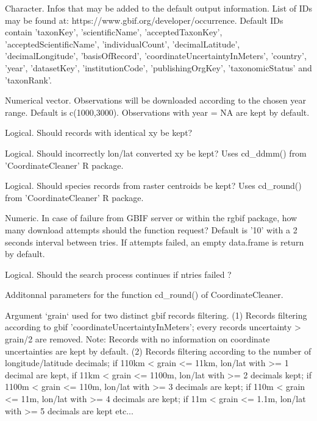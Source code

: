 \documentclass[a4paper]{book}
\begin{document}
\begin{Arguments}
\begin{ldescription}
\item[\code{add\_infos}] Character. Infos that may be added to the default output information.
List of IDs may be found at: https://www.gbif.org/developer/occurrence.
Default IDs contain 'taxonKey', 'scientificName', 'acceptedTaxonKey',
'acceptedScientificName', 'individualCount', 'decimalLatitude', 'decimalLongitude',
'basisOfRecord', 'coordinateUncertaintyInMeters', 'country', 'year', 'datasetKey', 
'institutionCode', 'publishingOrgKey', 'taxonomicStatus' and 'taxonRank'.

\item[\code{time\_period}] Numerical vector. Observations will be downloaded according to the chosen
year range. Default is c(1000,3000). Observations with year = NA are kept by default.

\item[\code{identic\_xy}] Logical. Should records with identical xy be kept?

\item[\code{wConverted\_xy}] Logical. Should incorrectly lon/lat converted xy be kept?
Uses cd\_ddmm() from 'CoordinateCleaner' R package.

\item[\code{centroids}] Logical. Should species records from raster centroids be kept?
Uses cd\_round() from 'CoordinateCleaner' R package.

\item[\code{ntries}] Numeric. In case of failure from GBIF server or within the rgbif package, how many
download attempts should the function request? Default is '10' with a 2 seconds interval
between tries. If attempts failed, an empty data.frame is return by default.

\item[\code{error.skip}] Logical. Should the search process continues if ntries failed ?

\item[\code{...}] Additonnal parameters for the function cd\_round() of CoordinateCleaner.
\end{ldescription}
\end{Arguments}
%
\begin{Details}\relax
Argument `grain` used for two distinct gbif records filtering. (1) Records filtering
according to gbif 'coordinateUncertaintyInMeters'; every records uncertainty > grain/2
are removed. Note: Records with no information on coordinate uncertainties are kept by
default. (2) Records filtering according to the number of longitude/latitude decimals;
if 110km < grain <= 11km, lon/lat with >= 1 decimal are kept, if 11km < grain <= 1100m,
lon/lat with >= 2 decimals kept; if 1100m < grain <= 110m, lon/lat with >= 3 decimals
are kept; if 110m < grain <= 11m, lon/lat with >= 4 decimals are kept;
if 11m < grain <= 1.1m, lon/lat with >= 5 decimals are kept etc...
\end{Details}
\end{document}
